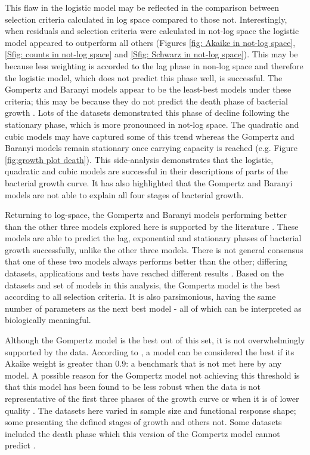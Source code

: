 \documentclass[11pt]{article}
\begin{document}
\begin{linenumbers}
        This flaw in the logistic model may be reflected in the comparison between selection criteria calculated in log space compared to those not. Interestingly, when residuals and selection criteria were calculated in not-log space the logistic model appeared to outperform all others (Figures \ref{fig: Akaike in not-log space}, \ref{Sfig: counts in not-log space} and \ref{Sfig: Schwarz in not-log space}). This may be because less weighting is accorded to the lag phase in non-log space and therefore the logistic model, which does not predict this phase well, is successful. The Gompertz and Baranyi models appear to be the least-best models under these criteria; this may be because they do not predict the death phase of bacterial growth \citep{salazar_primary_2021}. Lots of the datasets demonstrated this phase of decline following the stationary phase, which is more pronounced in not-log space. The quadratic and cubic models may have captured some of this trend whereas the Gompertz and Baranyi models remain stationary once carrying capacity is reached (e.g. Figure \ref{fig:growth plot death}). This side-analysis demonstrates that the logistic, quadratic and cubic models are successful in their descriptions of parts of the bacterial growth curve. It has also highlighted that the Gompertz and Baranyi models are not able to explain all four stages of bacterial growth.

        Returning to log-space, the Gompertz and Baranyi models performing better than the other three models explored here is supported by the literature \citep{zwietering_modeling_1990, mckellar_primary_2003, lopez_statistical_2004}. These models are able to predict the lag, exponential and stationary phases of bacterial growth successfully, unlike the other three models. There is not general consensus that one of these two models always performs better than the other; differing datasets, applications and tests have reached different results \citep[e.g.][]{zwietering_modeling_1990, baranyi_non-autonomous_1993, buchanan_when_1997, lopez_statistical_2004, oksuz_monte_2020}. Based on the datasets and set of models in this analysis, the Gompertz model is the best according to all selection criteria. It is also parsimonious, having the same number of parameters as the next best model - all of which can be interpreted as biologically meaningful. 

        Although the Gompertz model is the best out of this set, it is not overwhelmingly supported by the data. According to \cite{johnson_model_2004}, a model can be considered the best if its Akaike weight is greater than 0.9: a benchmark that is not met here by any model. A possible reason for the Gompertz model not achieving this threshold is that this model has been found to be less robust when the data is not representative of the first three phases of the growth curve or when it is of lower quality \citep{mckellar_primary_2003, baty_estimating_2004}. The datasets here varied in sample size and functional response shape; some presenting the defined stages of growth and others not. Some datasets included the death phase which this version of the Gompertz model cannot predict \citep{chatterjee_antibacterial_2015, salazar_primary_2021}.



\end{linenumbers}
\end{document}
